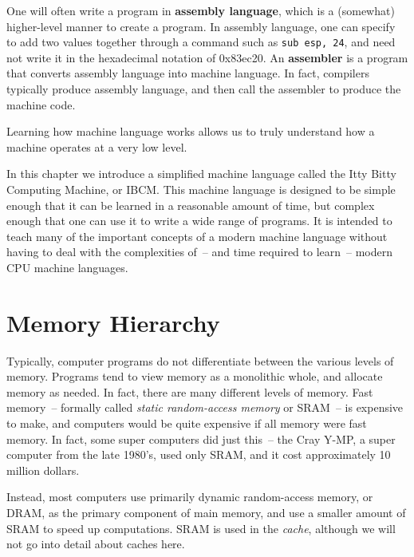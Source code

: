 One will often write a program in {\bf assembly language}, which is a
(somewhat) higher-level manner to create a program.  In assembly
language, one can specify to add two values together through a command
such as {\tt sub esp, 24}, and need not write it in the hexadecimal
notation of 0x83ec20.
An {\bf assembler} is a program that converts assembly language into
machine language.  In fact, compilers typically produce assembly
language, and then call the assembler to produce the machine code.

Learning how machine language works allows us to truly understand how
a machine operates at a very low level.

In this chapter we introduce a simplified machine language called the
Itty Bitty Computing Machine, or IBCM.  This machine language is
designed to be simple enough that it can be learned in a reasonable
amount of time, but complex enough that one can use it to write a wide
range of programs.  It is intended to teach many of the important
concepts of a modern machine language without having to deal with the
complexities of~-- and time required to learn~-- modern CPU machine
languages.


\section{Memory Hierarchy}

Typically, computer programs do not differentiate between the various
levels of memory.  Programs tend to view memory as a monolithic whole,
and allocate memory as needed.  In fact, there are many different
levels of memory.  Fast memory~-- formally called {\em static
  random-access memory} or SRAM~-- is expensive to make, and computers
would be quite expensive if all memory were fast memory.  In fact,
some super computers did just this~-- the Cray Y-MP, a super computer
from the late 1980's, used only SRAM, and it cost approximately 10
million dollars.

Instead, most computers use primarily {dynamic random-access memory},
or DRAM, as the primary component of main memory, and use a smaller
amount of SRAM to speed up computations.  SRAM is used in the {\em
  cache}, although we will not go into detail about caches here.

